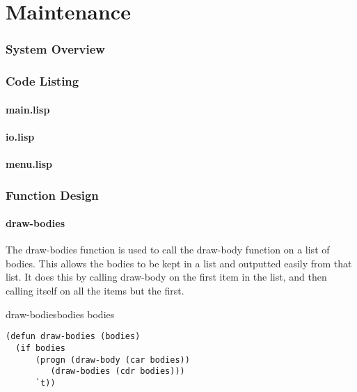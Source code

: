 \part{Maintenance}

\section{System Overview}


\section{Code Listing}
\subsection{main.lisp}

\subsection{io.lisp}

\subsection{menu.lisp}



\section{Function Design}

\subsection{draw-bodies}
The draw-bodies function is used to call the draw-body function on a list of
bodies. This allows the bodies to be kept in a list and outputted easily from
that list. It does this by calling draw-body on the first item in the list, and
then calling itself on all the items but the first.

\begin{pseudocode}{draw-bodies}{bodies}
	\IF bodies
	  \THEN 
	    \BEGIN
	    	 \\
	    \END
	  \ELSE
      	    \RETURN{\TRUE}	
\end{pseudocode}

\begin{lstlisting}
(defun draw-bodies (bodies)
  (if bodies
      (progn (draw-body (car bodies))
	     (draw-bodies (cdr bodies)))
      `t)) 
\end{lstlisting}

